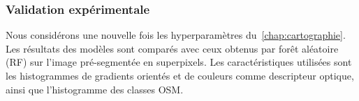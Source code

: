 \subsubsection{Validation expérimentale}
Nous considérons une nouvelle fois les hyperparamètres du~\cref{chap:cartographie}. Les résultats des modèles sont comparés avec ceux obtenus par forêt aléatoire (RF) sur l'image pré-segmentée en superpixels. Les caractéristiques utilisées sont les histogrammes de gradients orientés et de couleurs comme descripteur optique, ainsi que l'histogramme des classes \gls{OSM}.


